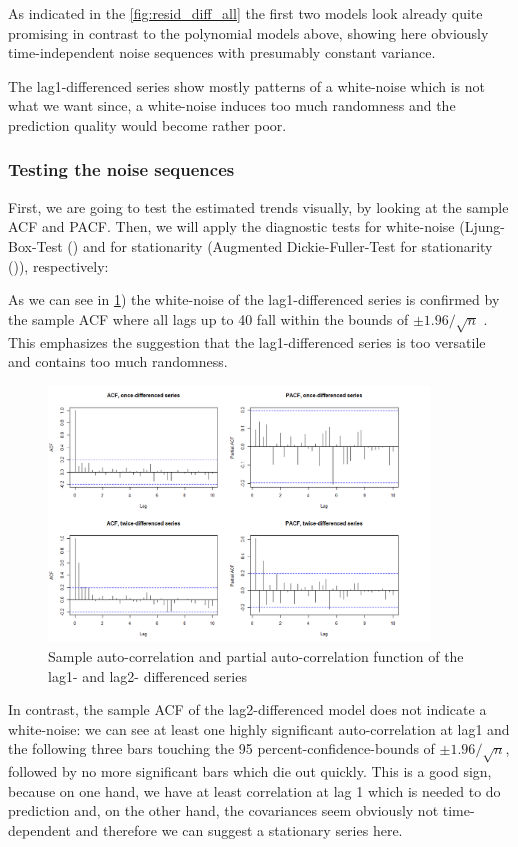 \documentclass[11pt,a4paper]{article}
\begin{document}
As indicated in the \cref{fig:resid_diff_all} the first two models look already quite promising in contrast to the polynomial models above, showing here obviously time-independent noise sequences with presumably constant variance.

The lag1-differenced series show mostly patterns of a white-noise which is not what we want since, a white-noise induces too much randomness and the prediction quality would become rather poor.


\subsubsection{Testing the noise sequences}

First, we are going to test the estimated trends visually, by looking at the sample ACF and PACF. Then, we will apply the diagnostic tests for white-noise (Ljung-Box-Test (\citep{LjungBox78}) and for stationarity (Augmented Dickie-Fuller-Test for stationarity (\citep{adf})), respectively:

As we can see in \cref{fig:diff12_acf_pacf}) the white-noise of the lag1-differenced series is confirmed by the sample ACF where all lags up to 40 fall within the bounds of $\pm 1.96/\sqrt{n}$ \cite[p.~39]{bd02}.
This emphasizes the suggestion that the lag1-differenced series is too versatile and contains too much randomness.

\begin{figure} [ht]
    \centering
    \includegraphics[width=0.9\textwidth]{diff12_acf_pacf}
    \caption{Sample auto-correlation and partial auto-correlation function of the lag1- and lag2- differenced series}
    \label{fig:diff12_acf_pacf}
\end{figure}

In contrast, the sample ACF of the lag2-differenced model does not indicate a white-noise: we can see at least one highly significant auto-correlation at lag1 and the following three bars touching the 95 percent-confidence-bounds of $\pm 1.96/\sqrt{n}$, followed by no more significant bars which die out quickly.
This is a good sign, because on one hand, we have at least correlation at lag 1 which is needed to do prediction and, on the other hand, the covariances seem obviously not time-dependent and therefore we can suggest a stationary series here.
\end{document}
